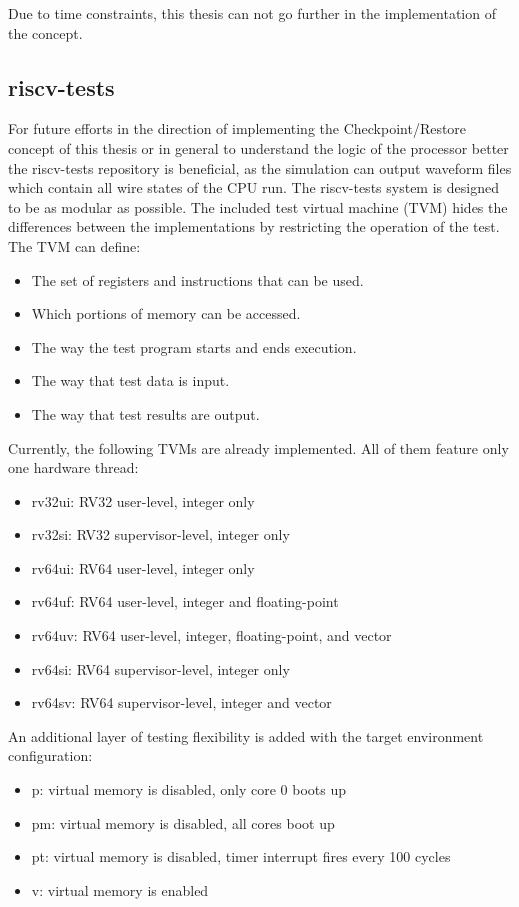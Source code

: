 Due to time constraints, this thesis can not go further in the implementation
of the concept.

\subsection{riscv-tests}
For future efforts in the direction of implementing the Checkpoint/Restore
concept of this thesis
or in general to understand the logic of the processor better the riscv-tests
repository is beneficial, as the simulation can output waveform files which
contain all wire states of the CPU run.
The riscv-tests system \cite{github_riscv-tests} is designed to be as modular as possible.
The included test virtual machine (TVM) hides the differences between
the implementations by restricting the operation of the test.
The TVM can define:
\begin{itemize}
    \item The set of registers and instructions that can be used.
    \item Which portions of memory can be accessed.
    \item The way the test program starts and ends execution.
    \item The way that test data is input.
    \item The way that test results are output.
\end{itemize}
\cite{github_riscv-tests} \newline
Currently, the following TVMs are already implemented.
All of them feature only one hardware thread:
\begin{itemize}
    \item rv32ui: RV32 user-level, integer only
    \item rv32si: RV32 supervisor-level, integer only
    \item rv64ui: RV64 user-level, integer only
    \item rv64uf: RV64 user-level, integer and floating-point
    \item rv64uv: RV64 user-level, integer, floating-point, and vector
    \item rv64si: RV64 supervisor-level, integer only
    \item rv64sv: RV64 supervisor-level, integer and vector
\end{itemize}
\cite{github_riscv-tests} \newline
An additional layer of testing flexibility is added with the
target environment configuration:
\begin{itemize}
    \item p: virtual memory is disabled, only core 0 boots up
    \item pm: virtual memory is disabled, all cores boot up
    \item pt: virtual memory is disabled, timer interrupt fires every 100 cycles
    \item v: virtual memory is enabled
\end{itemize}
